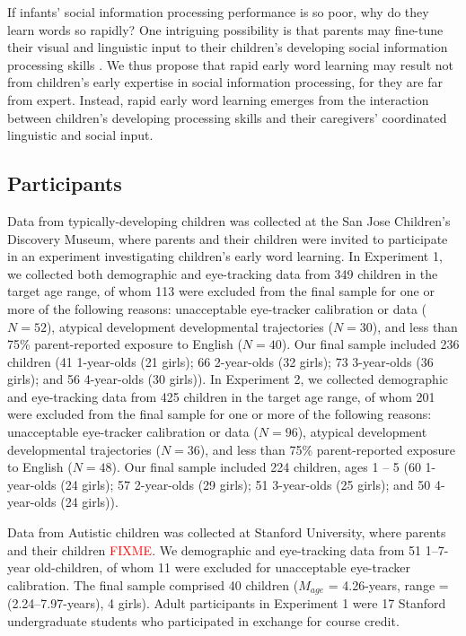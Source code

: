 \documentclass{pnastwo}
\newcommand{\red}[1]{\textcolor{red}{#1}}
\begin{document}
\begin{article}
If infants' social information processing performance is so poor, why do they learn words so rapidly? One intriguing possibility is that parents may fine-tune their visual and linguistic input to their children's developing social information processing skills \cite{snow1972,gogate2000,brand2002}. We thus propose that rapid early word learning may result not from children's early expertise in social information processing, for they are far from expert. Instead, rapid early word learning emerges from the interaction between children's developing processing skills and their caregivers' coordinated linguistic and social input.

\begin{materials}

\subsection{Participants} Data from typically-developing children was collected at the San Jose Children's Discovery Museum, where parents and their children were invited to participate in an experiment investigating children's early word learning. In Experiment 1, we collected both demographic and eye-tracking data from 349 children in the target age range, of whom 113 were excluded from the final sample for one or more of the following reasons: unacceptable eye-tracker calibration or data ($N=52$), atypical development developmental trajectories ($N=30$), and less than 75\% parent-reported exposure to English ($N=40$). Our final sample included 236 children (41 1-year-olds (21 girls); 66 2-year-olds (32 girls); 73 3-year-olds (36 girls); and 56 4-year-olds (30 girls)). In Experiment 2, we collected demographic and eye-tracking data from 425 children in the target age range, of whom 201 were excluded from the final sample for one or more of the following reasons: unacceptable eye-tracker calibration or data ($N=96$), atypical development developmental trajectories ($N=36$), and less than 75\% parent-reported exposure to English ($N=48$). Our final sample included 224 children, ages 1 -- 5 (60 1-year-olds (24 girls); 57 2-year-olds (29 girls); 51 3-year-olds (25 girls); and 50 4-year-olds (24 girls)).

Data from Autistic children was collected at Stanford University, where parents and their children \red{FIXME}. We demographic and eye-tracking data from 51 1--7-year old-children, of whom 11 were excluded for unacceptable eye-tracker calibration. The final sample comprised 40 children ($M_{age}$ = 4.26-years, range = (2.24--7.97-years), 4 girls). Adult participants in Experiment 1 were 17 Stanford undergraduate students who participated in exchange for course credit.


\end{materials}
\end{article}
\end{document}
